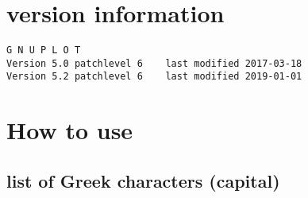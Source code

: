 \documentclass{ltjsarticle}
\begin{document}
	\tableofcontents%
	\pagebreak%

	\section{version information}

		\noindent%
		\verb|G N U P L O T|\\%
		\verb|Version 5.0 patchlevel 6    last modified 2017-03-18|\\%
		\verb|Version 5.2 patchlevel 6    last modified 2019-01-01|

	\section{How to use}

		\subsection{list of Greek characters (capital)}
\end{document}
